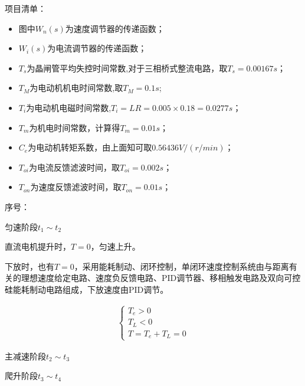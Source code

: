 \documentclass[forprint]{CSUBachelor}
\begin{document}
项目清单：

\begin{itemize}
    \item 图中$W_n(s)$为速度调节器的传递函数；
	\item $W_i(s)$为电流调节器的传递函数；
	\item $T_s$为晶闸管平均失控时间常数,对于三相桥式整流电路，取$T_s= 0.00167s$；
	\item $T_M$为电动机机电时间常数,取$T_M=0.1s$;
	\item $T_i$为电动机电磁时间常数,$T_i=LR=0.005\times0.18=0.0277s$；
	\item $T_m$为机电时间常数，计算得$T_m=0.01s$；
	\item $C_e$为电动机转矩系数，由上面知可取$0.56436V/(r/min)$；
	\item $T_{oi}$为电流反馈滤波时间，取$T_{oi}=0.002s$；
	\item $T_{on}$为速度反馈滤波时间，取$T_{on}=0.01s$；
\end{itemize}


序号：

\begin{enumerate}[\phantom{哈哈}（1）]
		
	{\bf \item 匀速阶段\quad $t_1\sim t_2$}

\begin{adjustwidth}{-2em}{0em}
\hspace{2em}直流电机提升时，$T=0$，匀速上升。

下放时，也有$T=0$，采用能耗制动、闭环控制，单闭环速度控制系统由与距离有关的理想速度给定电路、速度负反馈电路、PID调节器、移相触发电路及双向可控硅能耗制动电路组成，下放速度由PID调节。

	\begin{center}
	\begin{gather}
		\begin{cases}
		T_e>0\\
		T_L<0\\
		T=T_e+T_L=0
		\end{cases}
	\end{gather}
	\end{center}

\end{adjustwidth}

	{\bf \item 主减速阶段\quad $t_2\sim t_3$}
	{\bf \item 爬升阶段\quad $t_3\sim t_4$}

\end{enumerate}
\end{document}
